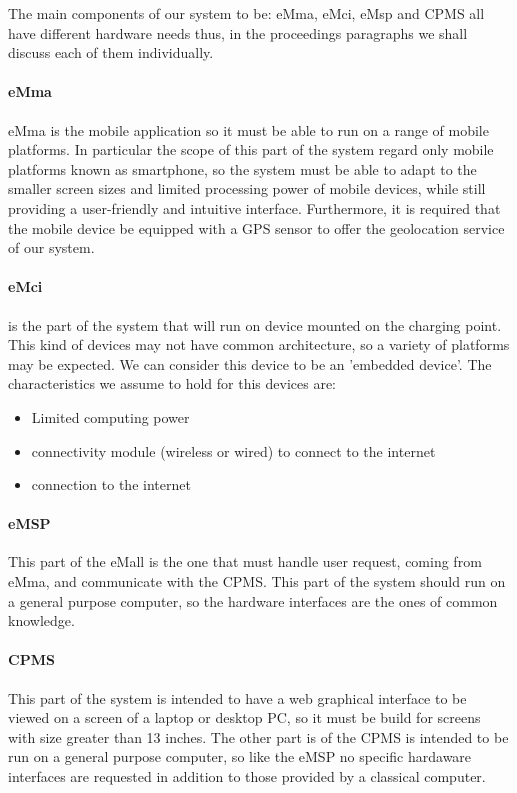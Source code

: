 The main components of our system to be: eMma, eMci, eMsp and CPMS all have different hardware needs thus, in the proceedings paragraphs we shall discuss each of them individually.

\paragraph{eMma} eMma is the mobile application so it must be able to run on a range of mobile platforms. In particular the scope of this part of the system regard only mobile platforms known as smartphone, so the system must be able to adapt to the smaller screen sizes and limited processing power of mobile devices, while still providing a user-friendly and intuitive interface. Furthermore, it is required that the mobile device be equipped with a GPS sensor to offer the geolocation service of our system.

\paragraph{eMci} is the part of the system that will run on device mounted on the charging point. This kind of devices may not have common architecture, so a variety of platforms may be expected. We can consider this device to be an 'embedded device'. The characteristics we assume to hold for this devices are:
\begin{itemize}
    \item Limited computing power
    \item connectivity module (wireless or wired) to connect to the internet
    \item connection to the internet
\end{itemize}

\paragraph{eMSP} This part of the eMall is the one that must handle user request, coming from eMma, and communicate with the CPMS. This part of the system should run on a general purpose computer, so the hardware interfaces are the ones of common knowledge.

\paragraph{CPMS} This part of the system is intended to have a web graphical interface to be viewed on a screen of a laptop or desktop PC, so it must be build for screens with size greater than 13 inches. The other part is of the CPMS is intended to be run on a general purpose computer, so like the eMSP no specific hardaware interfaces are requested in addition to those provided by a classical computer.
